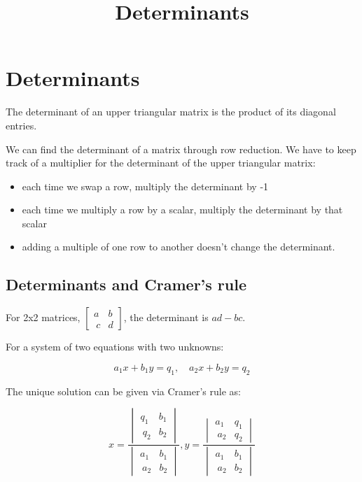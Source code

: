 \documentclass{article}
\title{Determinants}
\begin{document}
\section{Determinants}

The determinant of an upper triangular matrix is the product of its diagonal entries.

We can find the determinant of a matrix through row reduction. We have to keep track of a multiplier for the determinant of the upper triangular matrix:

\begin{itemize}
\item each time we swap a row, multiply the determinant by -1
\end{itemize}

\begin{itemize}
\item each time we multiply a row by a \@{scalar}, multiply the determinant by that scalar
\end{itemize}

\begin{itemize}
\item adding a multiple of one row to another doesn't change the determinant.
\end{itemize}

\subsection{Determinants and Cramer's rule}

For 2x2 matrices, $\begin{bmatrix} a & b \\\ c & d \end{bmatrix}$, the determinant is $ad - bc$.

For a system of two equations with two unknowns:

\[ a_1 x + b_1 y = q_1, \quad a_2 x + b_2 y = q_2 \]

The unique solution can be given via Cramer's rule as:

\[ x = \frac{\begin{vmatrix} q_1 & b_1 \\\ q_2 & b_2 \end{vmatrix}}{\begin{vmatrix} a_1 & b_1 \\\ a_2 & b_2 \end{vmatrix}}, y = \frac{\begin{vmatrix} a_1 & q_1 \\\ a_2 & q_2 \end{vmatrix}}{\begin{vmatrix} a_1 & b_1 \\\ a_2 & b_2 \end{vmatrix}} \]
\end{document}
